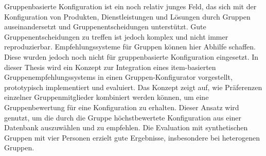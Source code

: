 \Abstract

Gruppenbasierte Konfiguration ist ein noch relativ junges Feld, das sich mit der Konfiguration von Produkten, Dienstleistungen und Lösungen durch Gruppen auseinandersetzt und Gruppenentscheidungen unterstützt. Gute Gruppenentscheidungen zu treffen ist jedoch komplex und nicht immer reproduzierbar. Empfehlungssysteme für Gruppen können hier Abhilfe schaffen. Diese wurden jedoch noch nicht für gruppenbasierte Konfiguration eingesetzt. In dieser Thesis wird ein Konzept zur Integration eines item-basierten Gruppenempfehlungssystems in einen Gruppen-Konfigurator vorgestellt, prototypisch implementiert und evaluiert. Das Konzept zeigt auf, wie Präferenzen einzelner Gruppenmitglieder kombiniert werden können, um eine Gruppenbewertung für eine Konfiguration zu erhalten. Dieser Ansatz wird genutzt, um die durch die Gruppe höchstbewertete Konfiguration aus einer Datenbank auszuwählen und zu empfehlen. Die Evaluation mit synthetischen Gruppen mit vier Personen erzielt gute Ergebnisse, insbesondere bei heterogenen Gruppen.
